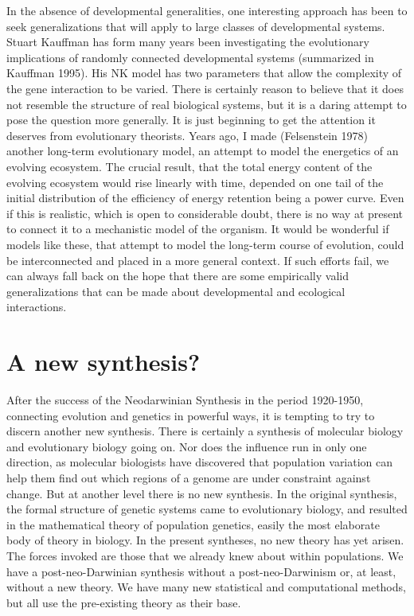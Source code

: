 \documentclass[12pt]{article}
\begin{document}
In the absence of developmental generalities, one interesting approach has been
to seek generalizations that will apply to large classes of developmental
systems.  Stuart Kauffman has form many years been investigating
the evolutionary implications of randomly connected developmental systems
(summarized in Kauffman 1995).  His NK model has two parameters that
allow the complexity of the gene interaction to be varied.  There is
certainly reason to believe that it does not resemble the structure of
real biological systems, but it is a daring attempt to pose the question
more generally.  It is just beginning to get the attention it deserves from
evolutionary theorists.  Years ago, I made (Felsenstein 1978) another
long-term evolutionary model, an attempt
to model the energetics of an evolving ecosystem.  The crucial result, that
the total energy content of the evolving ecosystem would rise linearly
with time, depended on one tail of the initial distribution of the efficiency
of energy retention being a power curve.  Even if this is realistic, which
is open to considerable doubt, there is no way at present to connect it to
a mechanistic model of the organism.  It would be wonderful if models like 
these, that attempt to model the long-term course of evolution,
could be interconnected and placed in a more general context.  If such
efforts fail, we can always fall back on the hope that there are some
empirically valid generalizations that can be made about developmental and
ecological interactions.

\section*{A new synthesis?}

After the success of the Neodarwinian Synthesis in the period 1920-1950,
connecting evolution and genetics in powerful ways, it is tempting to try to
discern another new synthesis.  There is certainly a synthesis of
molecular biology and evolutionary biology going on.  Nor does the
influence run in only one direction, as molecular biologists have
discovered that population variation can help them find out which regions
of a genome are under constraint against change.  But at another level
there is no new synthesis.  In the original synthesis, the formal structure
of genetic systems came to evolutionary biology, and resulted in the
mathematical theory of population genetics, easily the most elaborate
body of theory in biology.   In the present syntheses, no new theory has
yet arisen.  The forces invoked are those that we already knew about
within populations.  We have a post-neo-Darwinian synthesis without a
post-neo-Darwinism or, at least, without a new theory.  We have many
new statistical and computational methods, but all use the pre-existing
theory as their base.
\end{document}
